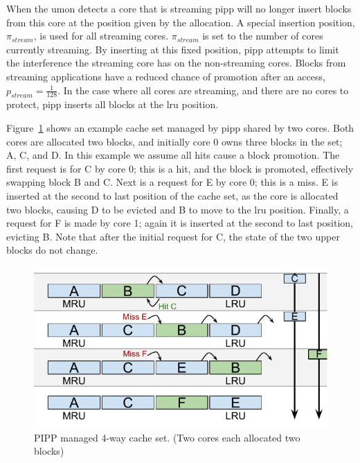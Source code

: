 When the \gls{umon} detects a core that is streaming \gls{pipp} will no longer insert blocks from this core at the position given by the allocation.
A special insertion position, $\pi_{stream}$, is used for all streaming cores.
$\pi_{stream}$ is set to the number of cores currently streaming. 
By inserting at this fixed position, \gls{pipp} attempts to limit the interference the streaming core has on the non-streaming cores.
Blocks from streaming applications have a reduced chance of promotion after an access, $p_{stream} = \frac{1}{128}$.
In the case where all cores are streaming, and there are no cores to protect, \gls{pipp} inserts all blocks at the \gls{lru} position.

Figure~\ref{fig:algorithms:pipp_example} shows an example cache set managed by \gls{pipp} shared by two cores.
Both cores are allocated two blocks, and initially core 0 owns three blocks in the set; A, C, and D.
In this example we assume all hits cause a block promotion.
The first request is for C by core 0; this is a hit, and the block is promoted, effectively swapping block B and C.
Next is a request for E by core 0; this is a miss.
E is inserted at the second to last position of the cache set, as the core is allocated two blocks, causing D to be evicted and B to move to the \gls{lru} position.
Finally, a request for F is made by core 1; again it is inserted at the second to last position, evicting B.
Note that after the initial request for C, the state of the two upper blocks do not change.

\begin{figure}[ht]
    \centering
    \includegraphics[width=.65\textwidth]{figures/algorithms/PIPP}
    \caption[PIPP managed 4-way cache set.]{PIPP managed 4-way cache set. (Two cores each allocated two blocks)}
    \label{fig:algorithms:pipp_example}
\end{figure}